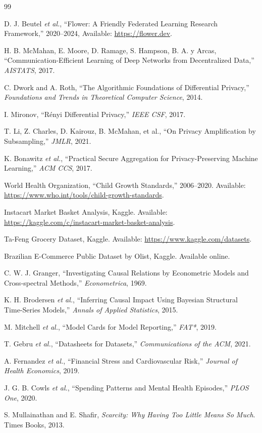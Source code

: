 \documentclass[conference]{IEEEtran}
\theoremstyle{plain}
\theoremstyle{remark}
\begin{document}
\balance
\begin{thebibliography}{99}

D. J. Beutel \emph{et al.}, ``Flower: A Friendly Federated Learning Research Framework,'' 2020--2024, Available: \url{https://flower.dev}.

H. B. McMahan, E. Moore, D. Ramage, S. Hampson, B. A. y Arcas, ``Communication-Efficient Learning of Deep Networks from Decentralized Data,'' \emph{AISTATS}, 2017.

C. Dwork and A. Roth, ``The Algorithmic Foundations of Differential Privacy,'' \emph{Foundations and Trends in Theoretical Computer Science}, 2014.

I. Mironov, ``R\'enyi Differential Privacy,'' \emph{IEEE CSF}, 2017.

T. Li, Z. Charles, D. Kairouz, B. McMahan, et al., ``On Privacy Amplification by Subsampling,'' \emph{JMLR}, 2021.

K. Bonawitz \emph{et al.}, ``Practical Secure Aggregation for Privacy-Preserving Machine Learning,'' \emph{ACM CCS}, 2017.

World Health Organization, ``Child Growth Standards,'' 2006--2020. Available: \url{https://www.who.int/tools/child-growth-standards}.

Instacart Market Basket Analysis, Kaggle. Available: \url{https://kaggle.com/c/instacart-market-basket-analysis}.

Ta-Feng Grocery Dataset, Kaggle. Available: \url{https://www.kaggle.com/datasets}.

Brazilian E-Commerce Public Dataset by Olist, Kaggle. Available online.

C. W. J. Granger, ``Investigating Causal Relations by Econometric Models and Cross-spectral Methods,'' \emph{Econometrica}, 1969.

K. H. Brodersen \emph{et al.}, ``Inferring Causal Impact Using Bayesian Structural Time-Series Models,'' \emph{Annals of Applied Statistics}, 2015.

M. Mitchell \emph{et al.}, ``Model Cards for Model Reporting,'' \emph{FAT*}, 2019.

T. Gebru \emph{et al.}, ``Datasheets for Datasets,'' \emph{Communications of the ACM}, 2021.

A. Fernandez \emph{et al.}, ``Financial Stress and Cardiovascular Risk,'' \emph{Journal of Health Economics}, 2019.

J. G. B. Cowls \emph{et al.}, ``Spending Patterns and Mental Health Episodes,'' \emph{PLOS One}, 2020.

S. Mullainathan and E. Shafir, \emph{Scarcity: Why Having Too Little Means So Much}. Times Books, 2013.

\end{thebibliography}
\end{document}
